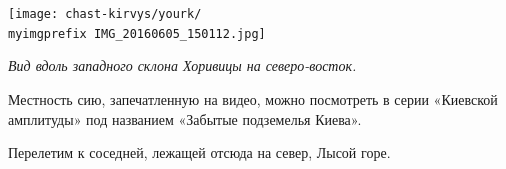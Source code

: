 \begin{center}
\texttt{[image: chast-kirvys/yourk/\\myimgprefix IMG\_20160605\_150112.jpg]}

\textit{Вид вдоль западного склона Хоривицы на северо-восток.}
\end{center}






Местность сию, запечатленную на видео, можно посмотреть в серии «Киевской амплитуды» под названием «Забытые подземелья Киева».


Перелетим к соседней, лежащей отсюда на север, Лысой горе.
